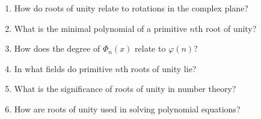 \begin{enumerate}
  \item How do roots of unity relate to rotations in the complex plane?
  \item What is the minimal polynomial of a primitive \(n\)th root of unity?
  \item How does the degree of \(\Phi_{n}(x)\) relate to \(\varphi(n)\)?
  \item In what fields do primitive \(n\)th roots of unity lie?
  \item What is the significance of roots of unity in number theory?
  \item How are roots of unity used in solving polynomial equations?
\end{enumerate}
